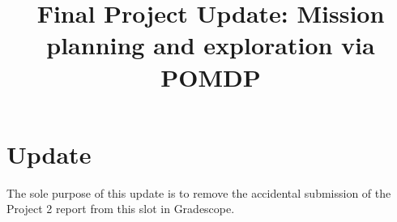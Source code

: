\documentclass[twoside,11pt]{article}
\begin{document}
\title{Final Project Update: Mission planning and exploration via POMDP}


\maketitle

\section*{Update}
The sole purpose of this update is to remove the accidental submission of the Project 2 report from this slot in Gradescope.


\end{document}
